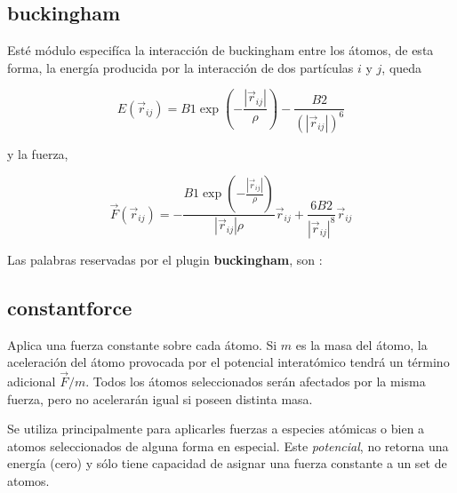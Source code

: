 \subsection{buckingham}

Est\'e m\'odulo especif\'ica la interacci\'on de buckingham entre los \'atomos, de esta forma, la energ\'ia producida por la interacci\'on de dos part\'iculas $i$ y $j$, queda

$$E(\vec{r}_{ij}) = B1 \exp\left(-\frac{|\vec{r}_{ij}|}{\rho}\right) - \frac{B2}{(|\vec{r}_{ij}|)^6}$$

y la fuerza,

$$\vec{F}(\vec{r}_{ij}) = -\frac{B1\exp\left(-\frac{|\vec{r}_{ij}|}{\rho}\right)}{|\vec{r}_{ij}|\rho}\vec{r}_{ij} + \frac{6B2}{|\vec{r}_{ij}|^8}\vec{r}_{ij}$$

Las palabras reservadas por el plugin \textbf{buckingham}, son :


\subsection{constantforce}
Aplica una fuerza constante sobre cada \'atomo. Si $m$ es la masa del \'atomo, la aceleraci\'on del \'atomo provocada por el potencial interat\'omico tendr\'a un t\'ermino adicional $\vec F/m$. Todos los \'atomos seleccionados ser\'an afectados por la misma fuerza, pero no acelerar\'an igual si poseen distinta masa.

Se utiliza principalmente para aplicarles fuerzas a especies at\'omicas o bien a atomos seleccionados de alguna forma en especial. Este \textit{potencial}, no retorna una energ\'ia (cero) y s\'olo tiene capacidad de asignar una fuerza constante a un set de atomos.\\
                                       
